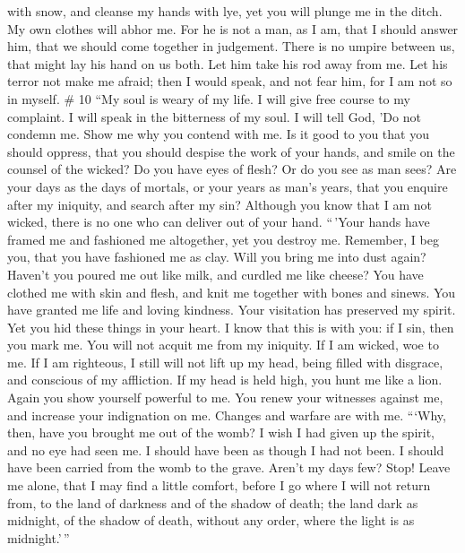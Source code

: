 with snow, and cleanse my hands with lye,  yet you will
plunge me in the ditch. My own clothes will abhor me.  For
he is not a man, as I am, that I should answer him, that we should come
together in judgement.  There is no umpire between us, that
might lay his hand on us both.  Let him take his rod away
from me. Let his terror not make me afraid;  then I would
speak, and not fear him, for I am not so in myself. \# 10 
``My soul is weary of my life. I will give free course to my complaint.
I will speak in the bitterness of my soul.  I will tell God,
'Do not condemn me. Show me why you contend with me.  Is it
good to you that you should oppress, that you should despise the work of
your hands, and smile on the counsel of the wicked?  Do you
have eyes of flesh? Or do you see as man sees?  Are your
days as the days of mortals, or your years as man's years, 
that you enquire after my iniquity, and search after my sin?
 Although you know that I am not wicked, there is no one who
can deliver out of your hand.  ``\,'Your hands have framed
me and fashioned me altogether, yet you destroy me. 
Remember, I beg you, that you have fashioned me as clay. Will you bring
me into dust again?  Haven't you poured me out like milk,
and curdled me like cheese?  You have clothed me with skin
and flesh, and knit me together with bones and sinews.  You
have granted me life and loving kindness. Your visitation has preserved
my spirit.  Yet you hid these things in your heart. I know
that this is with you:  if I sin, then you mark me. You
will not acquit me from my iniquity.  If I am wicked, woe
to me. If I am righteous, I still will not lift up my head, being filled
with disgrace, and conscious of my affliction.  If my head
is held high, you hunt me like a lion. Again you show yourself powerful
to me.  You renew your witnesses against me, and increase
your indignation on me. Changes and warfare are with me. 
```Why, then, have you brought me out of the womb? I wish I had given up
the spirit, and no eye had seen me.  I should have been as
though I had not been. I should have been carried from the womb to the
grave.  Aren't my days few? Stop! Leave me alone, that I
may find a little comfort,  before I go where I will not
return from, to the land of darkness and of the shadow of death;
 the land dark as midnight, of the shadow of death, without
any order, where the light is as midnight.'\,''

